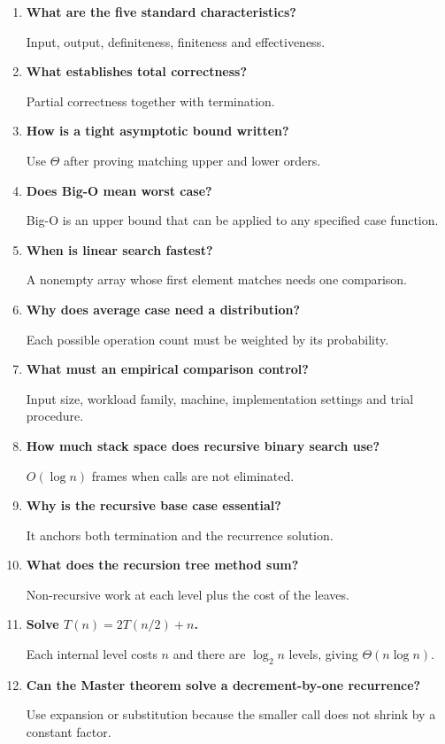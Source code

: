 \documentclass[12pt,a4paper]{article}
\newcommand{\Q}[1]{\textbf{#1}\par\noindent\ignorespaces}
\begin{document}
\begin{tcolorbox}[exambox, title={Frequently Asked / Viva Questions}]
\begin{enumerate}[topsep=0pt, label=\textbf{Q\arabic*.}, itemsep=5pt, leftmargin=*]
  \item \Q{What are the five standard characteristics?}
    Input, output, definiteness, finiteness and effectiveness.
  \item \Q{What establishes total correctness?}
    Partial correctness together with termination.
  \item \Q{How is a tight asymptotic bound written?}
    Use $\Theta$ after proving matching upper and lower orders.
  \item \Q{Does Big-O mean worst case?}
    Big-O is an upper bound that can be applied to any specified case function.
  \item \Q{When is linear search fastest?}
    A nonempty array whose first element matches needs one comparison.
  \item \Q{Why does average case need a distribution?}
    Each possible operation count must be weighted by its probability.
  \item \Q{What must an empirical comparison control?}
    Input size, workload family, machine, implementation settings and trial procedure.
  \item \Q{How much stack space does recursive binary search use?}
    $O(\log n)$ frames when calls are not eliminated.
  \item \Q{Why is the recursive base case essential?}
    It anchors both termination and the recurrence solution.
  \item \Q{What does the recursion tree method sum?}
    Non-recursive work at each level plus the cost of the leaves.
  \item \Q{Solve $T(n)=2T(n/2)+n$.}
    Each internal level costs $n$ and there are $\log_2 n$ levels, giving $\Theta(n\log n)$.
  \item \Q{Can the Master theorem solve a decrement-by-one recurrence?}
    Use expansion or substitution because the smaller call does not shrink by a constant factor.
\end{enumerate}
\end{tcolorbox}
\end{document}
